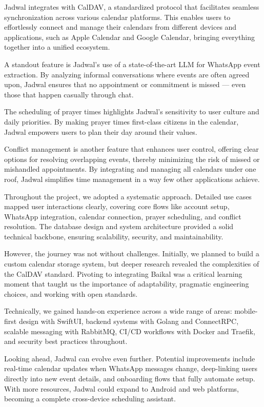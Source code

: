 \documentclass[12pt,a4paper,twoside]{report}
\begin{document}
Jadwal integrates with CalDAV, a standardized protocol that facilitates seamless synchronization across various calendar platforms. This enables users to effortlessly connect and manage their calendars from different devices and applications, such as Apple Calendar and Google Calendar, bringing everything together into a unified ecosystem.

A standout feature is Jadwal's use of a state-of-the-art LLM for WhatsApp event extraction. By analyzing informal conversations where events are often agreed upon, Jadwal ensures that no appointment or commitment is missed — even those that happen casually through chat.

The scheduling of prayer times highlights Jadwal's sensitivity to user culture and daily priorities. By making prayer times first-class citizens in the calendar, Jadwal empowers users to plan their day around their values.

Conflict management is another feature that enhances user control, offering clear options for resolving overlapping events, thereby minimizing the risk of missed or mishandled appointments. By integrating and managing all calendars under one roof, Jadwal simplifies time management in a way few other applications achieve.

Throughout the project, we adopted a systematic approach. Detailed use cases mapped user interactions clearly, covering core flows like account setup, WhatsApp integration, calendar connection, prayer scheduling, and conflict resolution. The database design and system architecture provided a solid technical backbone, ensuring scalability, security, and maintainability.

However, the journey was not without challenges. Initially, we planned to build a custom calendar storage system, but deeper research revealed the complexities of the CalDAV standard. Pivoting to integrating Baikal was a critical learning moment that taught us the importance of adaptability, pragmatic engineering choices, and working with open standards.

Technically, we gained hands-on experience across a wide range of areas: mobile-first design with SwiftUI, backend systems with Golang and ConnectRPC, scalable messaging with RabbitMQ, CI/CD workflows with Docker and Traefik, and security best practices throughout.

Looking ahead, Jadwal can evolve even further. Potential improvements include real-time calendar updates when WhatsApp messages change, deep-linking users directly into new event details, and onboarding flows that fully automate setup. With more resources, Jadwal could expand to Android and web platforms, becoming a complete cross-device scheduling assistant.
\end{document}
